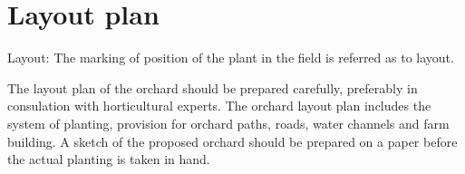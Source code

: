 \documentclass{book}
\begin{document}
\section{Layout plan}

Layout: The marking of position of the plant in the field is referred as to layout.

The layout plan of the orchard should be prepared carefully, preferably in consulation with horticultural experts. The orchard layout plan includes the system of planting, provision for orchard paths, roads, water channels and farm building. A sketch of the proposed orchard should be prepared on a paper before the actual planting is taken in hand.
\end{document}
